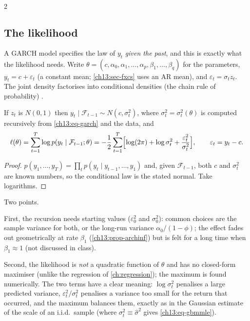 \begin{paracol}{2}
\subsection{The likelihood}\label{ch13:sec-lik}
A GARCH model specifies the law of $y_t$ \emph{given the past}, and this is exactly what the likelihood needs.
Write $\theta=(c,\alpha_0,\alpha_1,\dots,\alpha_p,\beta_1,\dots,\beta_q)$ for the parameters, $y_t=c+\varepsilon_t$ (a constant mean; \cref{ch13:sec-fxcs} uses an AR mean),
and $\varepsilon_t=\sigma_tz_t$. The joint density factorises into conditional densities (the chain rule of probability) .
\begin{proposition}\label{ch13:prop-lik}
If $z_t$ is $N(0,1)$ then $y_t\mid\mathcal F_{t-1}\sim N(c,\sigma_t^2)$, where $\sigma_t^2=\sigma_t^2(\theta)$ is computed recursively from
\eqref{ch13:eq-garch} and the data, and
\begin{equation}\label{ch13:eq-loglik}
  \ell(\theta)=\sum_{t=1}^T\log p(y_t\mid\mathcal F_{t-1};\theta)=-\frac12\sum_{t=1}^T\Bigl[\log(2\pi)+\log\sigma_t^2+\frac{\varepsilon_t^2}{\sigma_t^2}\Bigr],\qquad\varepsilon_t=y_t-c .
\end{equation}
\end{proposition}
\begin{proof}
$p(y_1,\dots,y_T)=\prod_tp(y_t\mid y_{t-1},\dots,y_1)$ and, given $\mathcal F_{t-1}$, both $c$ and $\sigma_t^2$ are known numbers, so the conditional law is the stated normal. Take logarithms.
\end{proof}
Two points.
\begin{secondary}
First, the recursion needs starting values ($\varepsilon_0^2$ and $\sigma_0^2$): common choices are the sample variance for both, or the long-run variance $\alpha_0/(1-\phi)$; the effect fades out
geometrically at rate $\beta_1$ (\cref{ch13:prop-archinf}) but is felt for a long time when $\beta_1\approx1$ (not discussed in class).
\end{secondary}
Second, the likelihood is \emph{not} a quadratic function of $\theta$
and has no closed-form maximiser (unlike the regression of \cref{ch:regression}); the maximum is found numerically. The two terms have a clear meaning: $\log\sigma_t^2$ penalises a large predicted variance,
$\varepsilon_t^2/\sigma_t^2$ penalises a variance too small for the return that occurred, and the maximum balances them, exactly as in the Gaussian estimate of the scale of an i.i.d.\ sample
(where $\sigma_t^2\equiv\hat\sigma^2$ gives \eqref{ch13:eq-gbmmle}).


\end{paracol}
